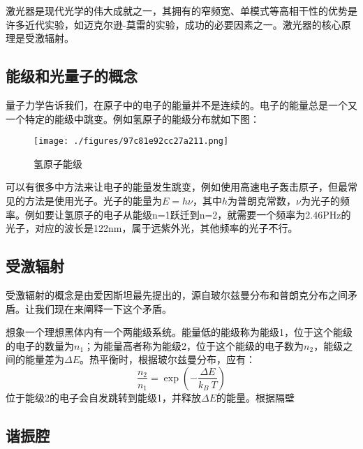 
\begin{issues}
\issueDraft
\issueTODO
\end{issues}

激光器是现代光学的伟大成就之一，其拥有的窄频宽、单模式等高相干性的优势是许多近代实验，如迈克尔逊-莫雷的实验，成功的必要因素之一。激光器的核心原理是受激辐射。

\subsection{能级和光量子的概念}
量子力学告诉我们，在原子中的电子的能量并不是连续的。电子的能量总是一个又一个特定的能级中跳变。例如氢原子的能级分布就如下图：\begin{figure}[ht]
\centering
\texttt{[image: ./figures/97c81e92cc27a211.png]}
\caption{氢原子能级} \label{fig_LaserT_1}
\end{figure}
可以有很多中方法来让电子的能量发生跳变，例如使用高速电子轰击原子，但最常见的方法是使用光子。光子的能量为$E=h\nu$，其中$h$为普朗克常数，$\nu$为光子的频率。例如要让氢原子的电子从能级n=1跃迁到n=2，就需要一个频率为2.46PHz的光子，对应的波长是122nm，属于远紫外光，其他频率的光子不行。
\subsection{受激辐射}
受激辐射的概念是由爱因斯坦最先提出的，源自玻尔兹曼分布和普朗克分布之间矛盾。让我们现在来阐释一下这个矛盾。

想象一个理想黑体内有一个两能级系统。能量低的能级称为能级1，位于这个能级的电子的数量为$n_1$；为能量高者称为能级2，位于这个能级的电子数为$n_2$，能级之间的能量差为$\Delta E$。热平衡时，根据玻尔兹曼分布，应有：
\begin{equation}
\frac{n_2}{n_1}=\exp(-\frac{\Delta E}{k_B \ T})
\end{equation}
位于能级2的电子会自发跳转到能级1，并释放$\Delta E$的能量。根据隔壁
\subsection{谐振腔}
